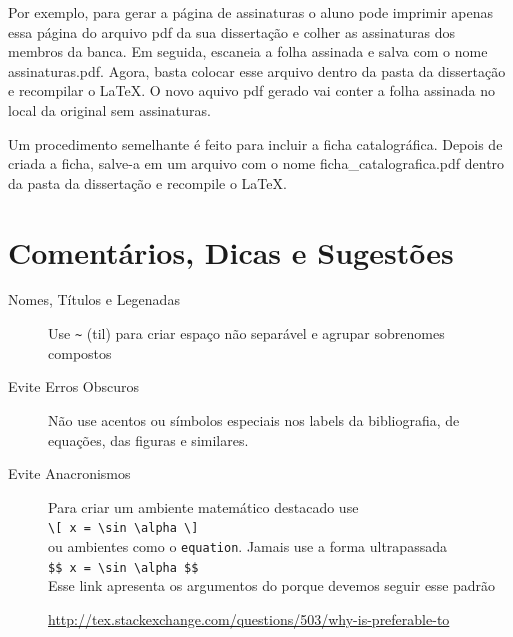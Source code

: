 \documentclass[fleqn]{icat-ufal}
\begin{document}
Por exemplo, para gerar a página de assinaturas o aluno pode imprimir apenas 
essa página do arquivo \textsf{pdf} da sua dissertação e colher as assinaturas 
dos membros da banca. Em seguida, escaneia a folha assinada e salva com o nome
\textsf{assinaturas.pdf}. Agora, basta colocar esse arquivo dentro da pasta 
da dissertação e recompilar o \LaTeX{}. O novo aquivo \textsf{pdf} gerado 
vai conter a folha assinada no local da original sem assinaturas.

Um procedimento semelhante é feito para incluir a ficha catalográfica.
Depois de criada a ficha, salve-a em um arquivo com o nome
\textsf{ficha\_catalografica.pdf} dentro da pasta da dissertação e recompile o 
\LaTeX{}.

\section{Comentários, Dicas e Sugestões}
\label{sec:comentarios_dicas_e_sugestoes}

\begin{description}
    \item[Nomes, Títulos e Legenadas]
        Use \lstinline!~! (til) para criar espaço não separável e agrupar 
        sobrenomes compostos 

    \item[Evite Erros Obscuros]
        Não use acentos ou símbolos especiais nos \textsf{labels} da bibliografia,
        de equações, das figuras e similares.

    \item[Evite Anacronismos]
        Para criar um ambiente matemático destacado use \\
        \lstinline!\[ x = \sin \alpha \]! \\
        ou ambientes como o \lstinline!equation!. Jamais use a forma ultrapassada \\
        \lstinline!$$ x = \sin \alpha $$!\\
        Esse link apresenta os argumentos do porque devemos seguir esse padrão
        \begin{center}
            \url{http://tex.stackexchange.com/questions/503/why-is-preferable-to}
        \end{center}

\end{description}

\end{document}
